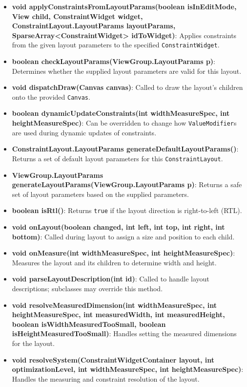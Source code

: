 \documentclass{report}
\begin{document}
\begin{itemize}
            \begin{itemize}
                \item \textbf{void applyConstraintsFromLayoutParams(boolean isInEditMode, View child, ConstraintWidget widget, ConstraintLayout.LayoutParams layoutParams, SparseArray<ConstraintWidget> idToWidget)}: Applies constraints from the given layout parameters to the specified \texttt{ConstraintWidget}.
                \item \textbf{boolean checkLayoutParams(ViewGroup.LayoutParams p)}: Determines whether the supplied layout parameters are valid for this layout.
                \item \textbf{void dispatchDraw(Canvas canvas)}: Called to draw the layout’s children onto the provided \texttt{Canvas}.
                \item \textbf{boolean dynamicUpdateConstraints(int widthMeasureSpec, int heightMeasureSpec)}: Can be overridden to change how \texttt{ValueModifier}s are used during dynamic updates of constraints.
                \item \textbf{ConstraintLayout.LayoutParams generateDefaultLayoutParams()}: Returns a set of default layout parameters for this \texttt{ConstraintLayout}.
                \item \textbf{ViewGroup.LayoutParams generateLayoutParams(ViewGroup.LayoutParams p)}: Returns a safe set of layout parameters based on the supplied parameters.
                \item \textbf{boolean isRtl()}: Returns \texttt{true} if the layout direction is right-to-left (RTL).
                \item \textbf{void onLayout(boolean changed, int left, int top, int right, int bottom)}: Called during layout to assign a size and position to each child.
                \item \textbf{void onMeasure(int widthMeasureSpec, int heightMeasureSpec)}: Measures the layout and its children to determine width and height.
                \item \textbf{void parseLayoutDescription(int id)}: Called to handle layout descriptions; subclasses may override this method.
                \item \textbf{void resolveMeasuredDimension(int widthMeasureSpec, int heightMeasureSpec, int measuredWidth, int measuredHeight, boolean isWidthMeasuredTooSmall, boolean isHeightMeasuredTooSmall)}: Handles setting the measured dimensions for the layout.
                \item \textbf{void resolveSystem(ConstraintWidgetContainer layout, int optimizationLevel, int widthMeasureSpec, int heightMeasureSpec)}: Handles the measuring and constraint resolution of the layout.

\end{itemize}
\end{itemize}
\end{document}
